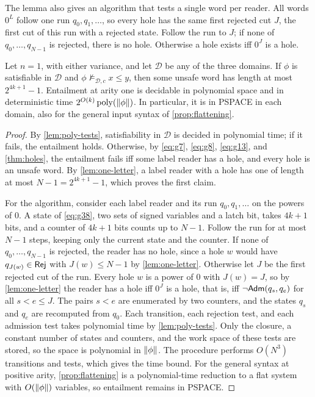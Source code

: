 The lemma also gives an algorithm that tests a single word per reader. All
words $0^L$ follow one run $q_0,q_1,\ldots$, so every hole has the same first
rejected cut $J$, the first cut of this run with a rejected state. Follow
the run to $J$; if none of $q_0,\ldots,q_{N-1}$ is rejected, there is no
hole. Otherwise a hole exists iff $0^J$ is a hole.

\begin{theorem}\label{thm:arity-one}
Let $n=1$, with either variance, and let $\mathcal D$ be any of the three
domains. If $\phi$ is satisfiable in $\mathcal D$ and
$\phi\not\models_{\mathcal D,c}x\le y$, then some unsafe word has length at
most $2^{4k+1}-1$. Entailment at arity one is decidable in polynomial space
and in deterministic time $2^{O(k)}\operatorname{poly}(\|\phi\|)$. In
particular, it is in PSPACE in each domain, also for the general input syntax
of \cref{prop:flattening}.
\end{theorem}

\begin{proof}
By \cref{lem:poly-tests}, satisfiability in $\mathcal D$ is decided in
polynomial time; if it fails, the entailment holds. Otherwise, by
\eqref{eq:g7}, \eqref{eq:g8}, \eqref{eq:g13}, and \cref{thm:holes}, the
entailment fails iff some label reader has a hole, and every hole is an
unsafe word. By \cref{lem:one-letter}, a label reader with a hole has one of
length at most $N-1=2^{4k+1}-1$, which proves the first claim.

For the algorithm, consider each label reader and its run
$q_0,q_1,\ldots$ on the powers of $0$. A state of \eqref{eq:g38}, two sets of
signed variables and a latch bit, takes $4k+1$ bits, and a counter of $4k+1$
bits counts up to $N-1$. Follow the run for at most $N-1$ steps, keeping only
the current state and the counter. If none of $q_0,\ldots,q_{N-1}$ is
rejected, the reader has no hole, since a hole $w$ would have
$q_{J(w)}\in\mathsf{Rej}$ with $J(w)\le N-1$ by \cref{lem:one-letter}. Otherwise let
$J$ be the first rejected cut of the run. Every hole $w$ is a power of $0$
with $J(w)=J$, so by \cref{lem:one-letter} the reader has a hole iff $0^J$ is
a hole, that is, iff $\neg\mathsf{Adm}(q_s,q_e)$ for all $s<e\le J$. The pairs $s<e$
are enumerated by two counters, and the states $q_s$ and $q_e$ are
recomputed from $q_0$. Each transition, each rejection test, and each
admission test takes polynomial time by \cref{lem:poly-tests}. Only the
closure, a constant number of states and counters, and the work space of
these tests are stored, so the space is polynomial in $\|\phi\|$. The
procedure performs $O(N^3)$ transitions and tests, which gives the time
bound. For the general syntax at positive arity, \cref{prop:flattening} is a
polynomial-time reduction to a flat system with $O(\|\phi\|)$ variables,
so entailment remains in PSPACE.
\end{proof}

